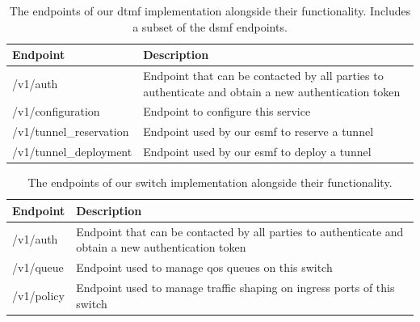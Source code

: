 \begin{table}[htp]
    \begin{tabularx}{\textwidth}{ |l|X| }
        \hline
        \textbf{Endpoint}       & \textbf{Description}                                                                                \\
        \hline
        /v1/auth                & Endpoint that can be contacted by all parties to authenticate and obtain a new authentication token \\
        /v1/configuration       & Endpoint to configure this service                                                                  \\
        \hline
        /v1/tunnel\_reservation & Endpoint used by our \acrshort{esmf} to reserve a tunnel                                            \\
        /v1/tunnel\_deployment  & Endpoint used by our \acrshort{esmf} to deploy a tunnel                                             \\
        \hline
    \end{tabularx}
    \caption[\acrshort{dtmf} endpoints]{The endpoints of our \acrshort{dtmf} implementation alongside their functionality. Includes a subset of the \acrshort{dsmf} endpoints.}
    \label{table:dtmf}
\end{table}

\begin{table}[htp]
    \begin{tabularx}{\textwidth}{ |l|X| }
        \hline
        \textbf{Endpoint} & \textbf{Description}                                                                                \\
        \hline
        /v1/auth          & Endpoint that can be contacted by all parties to authenticate and obtain a new authentication token \\
        \hline
        /v1/queue         & Endpoint used to manage \acrshort{qos} queues on this switch                                        \\
        /v1/policy        & Endpoint used to manage traffic shaping on ingress ports of this switch                             \\
        \hline
    \end{tabularx}
    \caption[Switch endpoints]{The endpoints of our switch implementation alongside their functionality.}
    \label{table:switch}
\end{table}

